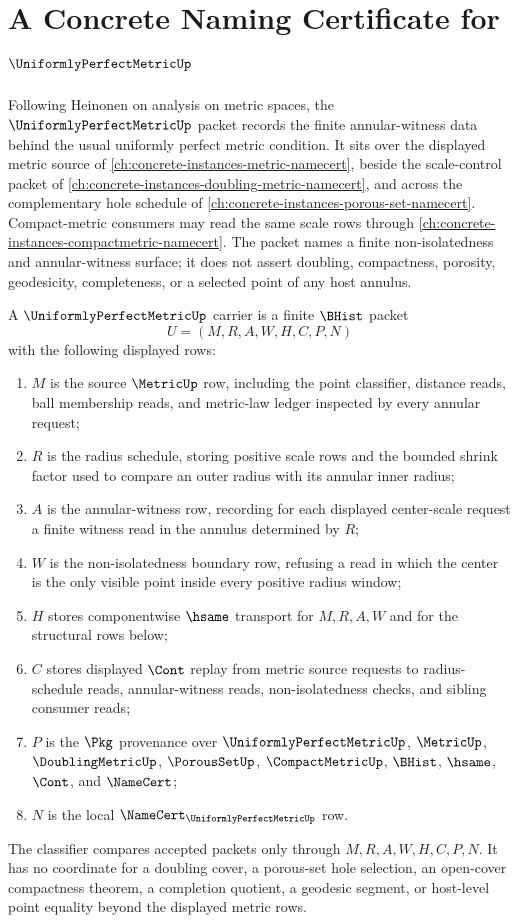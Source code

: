 \chapter{A Concrete Naming Certificate for $\UniformlyPerfectMetricUp$}
\label{ch:concrete-instances-uniformly-perfect-metric-namecert}

Following Heinonen on analysis on metric spaces, the $\UniformlyPerfectMetricUp$ packet records the finite annular-witness data behind the usual uniformly perfect metric condition. It sits over the displayed metric source of \autoref{ch:concrete-instances-metric-namecert}, beside the scale-control packet of \autoref{ch:concrete-instances-doubling-metric-namecert}, and across the complementary hole schedule of \autoref{ch:concrete-instances-porous-set-namecert}. Compact-metric consumers may read the same scale rows through \autoref{ch:concrete-instances-compactmetric-namecert}. The packet names a finite non-isolatedness and annular-witness surface; it does not assert doubling, compactness, porosity, geodesicity, completeness, or a selected point of any host annulus.

\begin{definition}
\label{def:uniformly-perfect-metric-carrier}
A $\UniformlyPerfectMetricUp$ carrier is a finite $\BHist$ packet
$$
U=(M,R,A,W,H,C,P,N)
$$
with the following displayed rows:
\begin{enumerate}
\item $M$ is the source $\MetricUp$ row, including the point classifier, distance reads, ball membership reads, and metric-law ledger inspected by every annular request;
\item $R$ is the radius schedule, storing positive scale rows and the bounded shrink factor used to compare an outer radius with its annular inner radius;
\item $A$ is the annular-witness row, recording for each displayed center-scale request a finite witness read in the annulus determined by $R$;
\item $W$ is the non-isolatedness boundary row, refusing a read in which the center is the only visible point inside every positive radius window;
\item $H$ stores componentwise $\hsame$ transport for $M,R,A,W$ and for the structural rows below;
\item $C$ stores displayed $\Cont$ replay from metric source requests to radius-schedule reads, annular-witness reads, non-isolatedness checks, and sibling consumer reads;
\item $P$ is the $\Pkg$ provenance over $\UniformlyPerfectMetricUp$, $\MetricUp$, $\DoublingMetricUp$, $\PorousSetUp$, $\CompactMetricUp$, $\BHist$, $\hsame$, $\Cont$, and $\NameCert$;
\item $N$ is the local $\NameCert_{\UniformlyPerfectMetricUp}$ row.
\end{enumerate}
The classifier compares accepted packets only through $M,R,A,W,H,C,P,N$. It has no coordinate for a doubling cover, a porous-set hole selection, an open-cover compactness theorem, a completion quotient, a geodesic segment, or host-level point equality beyond the displayed metric rows.
\end{definition}

